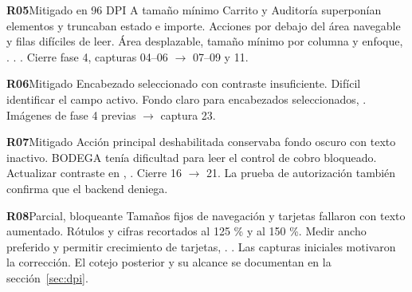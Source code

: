\par\medskip\noindent\begin{minipage}{\linewidth}\noindent\textbf{R05}\quad\textsf{Mitigado en 96 DPI}
 A tamaño mínimo Carrito y Auditoría superponían elementos y truncaban estado e importe.
 Acciones por debajo del área navegable y filas difíciles de leer.
 Área desplazable, tamaño mínimo por columna y enfoque, .
 . . 
 Cierre fase 4, capturas 04–06 $\to$ 07–09 y 11.
\end{minipage}\par
\par\medskip\noindent\begin{minipage}{\linewidth}\noindent\textbf{R06}\quad\textsf{Mitigado}
 Encabezado seleccionado con contraste insuficiente.
 Difícil identificar el campo activo.
 Fondo claro para encabezados seleccionados, .
 
 Imágenes de fase 4 previas $\to$ captura 23.
\end{minipage}\par
\par\medskip\noindent\begin{minipage}{\linewidth}\noindent\textbf{R07}\quad\textsf{Mitigado}
 Acción principal deshabilitada conservaba fondo oscuro con texto inactivo.
 BODEGA tenía dificultad para leer el control de cobro bloqueado.
 Actualizar contraste en , .
 
 Cierre 16 $\to$ 21. La prueba de autorización también confirma que el backend deniega.
\end{minipage}\par
\par\medskip\noindent\begin{minipage}{\linewidth}\noindent\textbf{R08}\quad\textsf{Parcial, bloqueante}
 Tamaños fijos de navegación y tarjetas fallaron con texto aumentado.
 Rótulos y cifras recortados al 125 \% y al 150 \%.
 Medir ancho preferido y permitir crecimiento de tarjetas, .
 . 
 Las capturas iniciales motivaron la corrección. El cotejo posterior y su alcance se documentan en la sección~\ref{sec:dpi}.
\end{minipage}\par
